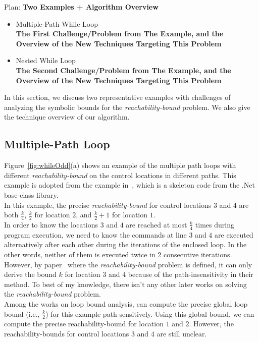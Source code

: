 Plan:
\textbf{Two Examples + Algorithm Overview}
\begin{itemize}
\item {Multiple-Path While Loop}
\\
\textbf{The First Challenge/Problem from The Example, 
and the Overview of the New Techniques Targeting This Problem}
\item {Nested While Loop}
\\
\textbf{The Second Challenge/Problem from The Example,
and the Overview of the New Techniques Targeting This Problem}
\end{itemize}
In this section, we discuss two representative examples with
challenges of analyzing the symbolic bounds for the \emph{reachability-bound} problem.
We also give the technique overview of our algorithm.
%
\subsection{Multiple-Path Loop}
\label{sec:overview-multiplepath}

Figure~\ref{fig:whileOdd}(a) shows an example of the multiple path loops
with different \emph{reachability-bound} on the control locations in different paths.
This example is adopted from the example in~\cite{Sumit2010rechability}, which
is a skeleton code from the .Net base-class library.
\\
In this example,
the precise \emph{reachability-bound} for control locations $3$ and $4$ are both $\frac{k}{4}$,
$\frac{k}{2}$ for location $2$, and $\frac{k}{2} + 1$ for location $1$.
\\
In order to know the locations $3$ and $4$ are reached at most $\frac{k}{4}$ times during program execution,
we need to know the commands at line $3$ and $4$ are executed alternatively after each other
during the iterations of the enclosed loop.
In the other words, neither of them is executed twice in 2 consecutive iterations.
\\
However, by paper~\cite{Sumit2010rechability} where the \emph{reachability-bound} problem is defined,
it can only derive the bound $k$ for location $3$ and $4$ because of the path-insensitivity in their method.
To best of my knowledge, there isn't any other later works on solving the \emph{reachability-bound} problem.
\\
Among the works on loop bound analysis, \cite{GulwaniJK09} can compute the precise global
loop bound (i.e., $\frac{k}{2}$) for this example path-sensitively.
Using this global bound, we can compute the precise reachability-bound for location $1$ and $2$.
However, the reachability-bounds for control locations $3$ and $4$ are still unclear.
